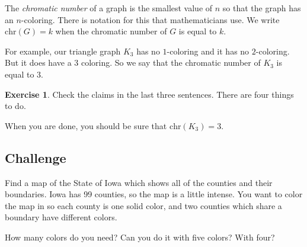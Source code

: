 \documentclass[12pt,letterpaper]{article}
\theoremstyle{definition}
\newtheorem{exercise}[question]{Exercise}
\begin{document}
The \emph{chromatic number} of a graph is the smallest value of $n$ so that the graph has an $n$-coloring. 
There is notation for this that mathematicians use. We write $\mathrm{chr}(G) = k$ when the chromatic number
of $G$ is equal to $k$.

For example, our triangle graph $K_3$ has no $1$-coloring and it has no $2$-coloring. But it does have a $3$ coloring. So we say that the chromatic number of $K_3$ is equal to $3$.

\begin{exercise}
Check the claims in the last three sentences. There are four things to do.

When you are done, you should be sure that $\mathrm{chr}(K_3) = 3$.
\end{exercise}


\subsection*{Challenge}

Find a map of the State of Iowa which shows all of the counties and their boundaries. Iowa has 99 counties, so the 
map is a little intense. You want to color the map in so each county is one solid color, and two counties
which share a boundary have different colors.

How many colors do you need? Can you do it with five colors? With four?



\end{document}
